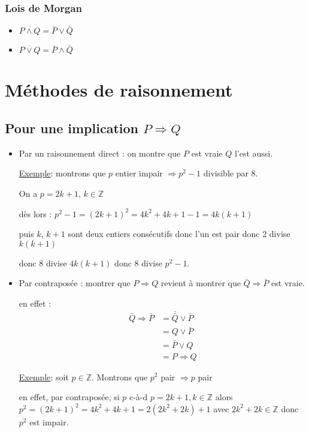 \documentclass[12pt,a4paper,french]{book}
\begin{document}
\subsubsection{Lois de Morgan}
\begin{itemize}
\item $ \overline{P \wedge Q} = \bar{P} \vee \bar{Q}$
\item $ \overline{P \vee Q} = \bar{P} \wedge \bar{Q}$
\end{itemize}

\section{Méthodes de raisonnement}

\subsection{Pour une implication $P \Rightarrow Q$} \label{1.3.A}

\begin{itemize}
	\item Par un raisonnement direct : on montre que  $P$ est vraie  $Q$ l'est aussi.

\underline{Exemple}: montrons que $p$ entier impair $\Rightarrow p^{2}-1$ divisible par 8.

On a $p = 2k+1$, $k \in \mathbb{Z}$

dès lors : $p^{2}-1 = (2k+1)^{2} = 4k^{2}+4k+1-1 = 4k(k+1)$

puis $k$, $k+1$ sont deux entiers consécutifs donc l'un est pair donc 2 divise $k(k+1)$

donc 8 divise $4k(k+1)$ donc 8 divise $p^{2}-1$.
\item Par contraposée : montrer que $P \Rightarrow Q$ revient à montrer que $\bar{Q} \Rightarrow \bar{P}$ est vraie.

en effet :
\begin{equation}
\begin{split} 
	\bar{Q} \Rightarrow \bar{P} &= \bar{\bar{Q}} \vee \bar{P} \\ &= Q \vee \bar{P} \\ &= \bar{P} \vee Q \\ &= P \Rightarrow Q \end{split}
\end{equation}

\underline{Exemple}: soit $p \in \mathbb{Z}$. Montrons que $p^{2}$ pair $\Rightarrow p$ pair

en effet, par contraposée, si $p$ c-à-d $p = 2k+1, k \in \mathbb{Z}$
alors $p^{2} = (2k+1)^{2} = 4k^{2}+4k+1 = 2(2k^{2}+2k)+1$ avec $2k^{2}+2k \in \mathbb{Z}$ donc $p^{2}$ est impair.
\end{itemize}
\end{document}
